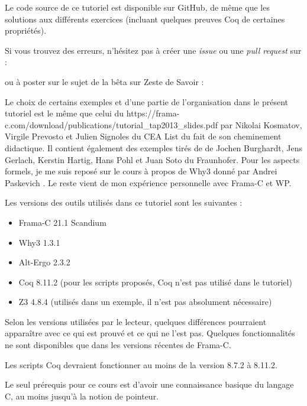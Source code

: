 \begin{Warning}
  Le code source de ce
  tutoriel est disponible sur GitHub, de même que les solutions aux
  différents exercices (incluant quelques preuves Coq de certaines
  propriétés).

  Si vous trouvez des erreurs, n'hésitez pas à créer une \textit{issue} ou
  une \textit{pull request} sur :


  ou à poster sur le sujet de la bêta sur Zeste de Savoir :

\end{Warning}

\begin{Information}
Le choix de certains exemples et d'une partie de l'organisation dans le présent
tutoriel est le même que celui du
             {https://frama-c.com/download/publications/tutorial_tap2013_slides.pdf}
par Nikolai Kosmatov, Virgile Prevosto et Julien Signoles du CEA List du fait de
son cheminement didactique. Il contient également des exemples tirés de
\textit{}
de Jochen Burghardt, Jens Gerlach, Kerstin Hartig, Hans Pohl et Juan Soto du
Fraunhofer. Pour les aspects formels, je me suis reposé sur le cours
à propos de Why3 donné par Andrei Paskevich
\textit{}.
Le reste vient de mon expérience personnelle avec Frama-C et WP.

\horizontalLine

Les versions des outils utilisés dans ce tutoriel sont les suivantes :
\begin{itemize}
\item Frama-C 21.1 Scandium
\item Why3 1.3.1
\item Alt-Ergo 2.3.2
\item Coq 8.11.2 (pour les scripts proposés, Coq n'est pas utilisé dans le tutoriel)
\item Z3 4.8.4 (utilisés dans un exemple, il n'est pas absolument nécessaire)
\end{itemize}
Selon les versions utilisées par le lecteur, quelques différences pourraient
apparaître avec ce qui est prouvé et ce qui ne l'est pas. Quelques fonctionnalités
ne sont disponibles que dans les versions récentes de Frama-C.

Les scripts Coq devraient fonctionner au moins de la version 8.7.2 à 8.11.2.

\horizontalLine

Le seul prérequis pour ce cours est d'avoir une connaissance basique du
langage C, au moins jusqu'à la notion de pointeur.


\end{Information}


